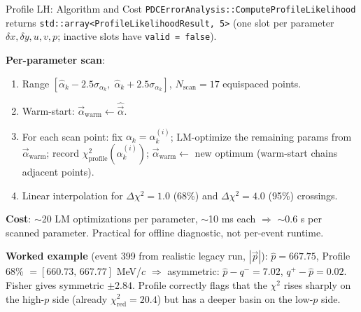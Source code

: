 \documentclass[aspectratio=169]{beamer}
\begin{document}
\begin{frame}{Profile LH: Algorithm and Cost}
\small
\texttt{PDCErrorAnalysis::ComputeProfileLikelihood} returns \texttt{std::array<ProfileLikelihoodResult, 5>} (one slot per parameter $\delta x, \delta y, u, v, p$; inactive slots have \texttt{valid = false}).

\textbf{Per-parameter scan}:
\begin{enumerate}\setlength{\itemsep}{0pt}
\item Range $[\hat{\alpha}_k - 2.5\sigma_{\alpha_k},\; \hat{\alpha}_k + 2.5\sigma_{\alpha_k}]$, $N_\mathrm{scan} = 17$ equispaced points.
\item Warm-start: $\vec{\alpha}_\mathrm{warm} \gets \hat{\vec{\alpha}}$.
\item For each scan point: fix $\alpha_k = \alpha_k^{(i)}$; LM-optimize the remaining params from $\vec{\alpha}_\mathrm{warm}$; record $\chi^2_\mathrm{profile}(\alpha_k^{(i)})$; $\vec{\alpha}_\mathrm{warm} \gets$ new optimum (warm-start chains adjacent points).
\item Linear interpolation for $\Delta\chi^2 = 1.0$ (68\%) and $\Delta\chi^2 = 4.0$ (95\%) crossings.
\end{enumerate}

\textbf{Cost}: $\sim$20 LM optimizations per parameter, $\sim$10 ms each $\Rightarrow$ $\sim 0.6$ s per scanned parameter. Practical for offline diagnostic, not per-event runtime.

\vspace{0.1cm}
\textbf{Worked example} (event 399 from realistic legacy run, $|\vec p|$):
$\hat{p} = 667.75$, Profile 68\% $= [660.73,\, 667.77]$ MeV/$c$ $\Rightarrow$ asymmetric: $\hat{p} - q^- = 7.02$, $q^+ - \hat{p} = 0.02$. Fisher gives symmetric $\pm 2.84$. Profile correctly flags that the $\chi^2$ rises sharply on the high-$p$ side (already $\chi^2_\mathrm{red} = 20.4$) but has a deeper basin on the low-$p$ side.
\end{frame}
\end{document}
